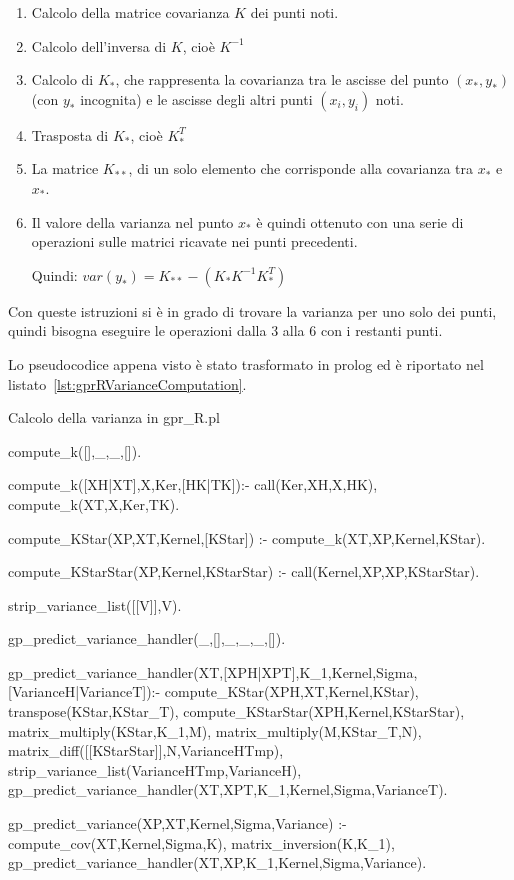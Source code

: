 \documentclass[10pt,titlepage,twoside,a4paper]{report}
\newenvironment{code}{\singlespacing\captionsetup{type=listing}}{}
\begin{document}
\begin{enumerate}
\item Calcolo della matrice covarianza $K$ dei punti noti.

\item Calcolo dell'inversa di $K$, cioè $K^{-1}$

\item Calcolo di $K_{\ast}$, che rappresenta la covarianza tra
le ascisse del punto $(x_{\ast},y_{\ast})$ (con $y_{\ast}$ incognita) e le 
ascisse degli altri punti $(x_{i},y_{i})$ noti.

\item Trasposta di $K_{\ast}$, cioè $K_{\ast}^T$

\item La matrice $K_{\ast\ast}$, di un solo elemento che 
corrisponde alla covarianza tra $x_{\ast}$ e $x_{\ast}$.

\item Il valore della varianza nel punto $x_{\ast}$ è quindi ottenuto 
con una serie di operazioni sulle matrici ricavate nei punti precedenti. 

Quindi: $var(y_{\ast}) = K_{\ast\ast} - (K_{\ast} K^{-1} K_{\ast}^T)$
\end{enumerate}

Con queste istruzioni si è in grado di trovare la varianza per uno 
solo dei punti, quindi bisogna eseguire le operazioni dalla 3 
alla 6 con i restanti punti.

Lo pseudocodice appena visto è stato trasformato in prolog ed è riportato nel 
listato~\ref{lst:gprRVarianceComputation}.

\begin{code}
\caption{Calcolo della varianza in gpr\_R.pl}
\label{lst:gprRVarianceComputation}
\begin{prologcode*}{}
compute_k([],_,_,[]).

compute_k([XH|XT],X,Ker,[HK|TK]):-
  call(Ker,XH,X,HK),
  compute_k(XT,X,Ker,TK).

compute_KStar(XP,XT,Kernel,[KStar]) :-
    compute_k(XT,XP,Kernel,KStar).

compute_KStarStar(XP,Kernel,KStarStar) :-
    call(Kernel,XP,XP,KStarStar).

strip_variance_list([[V]],V).

gp_predict_variance_handler(_,[],_,_,_,[]).

gp_predict_variance_handler(XT,[XPH|XPT],K_1,Kernel,Sigma,[VarianceH|VarianceT]):-
    compute_KStar(XPH,XT,Kernel,KStar),
    transpose(KStar,KStar_T),
    compute_KStarStar(XPH,Kernel,KStarStar),
    matrix_multiply(KStar,K_1,M),
    matrix_multiply(M,KStar_T,N),
    matrix_diff([[KStarStar]],N,VarianceHTmp),
    strip_variance_list(VarianceHTmp,VarianceH),
    gp_predict_variance_handler(XT,XPT,K_1,Kernel,Sigma,VarianceT).

gp_predict_variance(XP,XT,Kernel,Sigma,Variance) :-
    compute_cov(XT,Kernel,Sigma,K),
    matrix_inversion(K,K_1),
    gp_predict_variance_handler(XT,XP,K_1,Kernel,Sigma,Variance).
\end{prologcode*}
\end{code}
\end{document}
